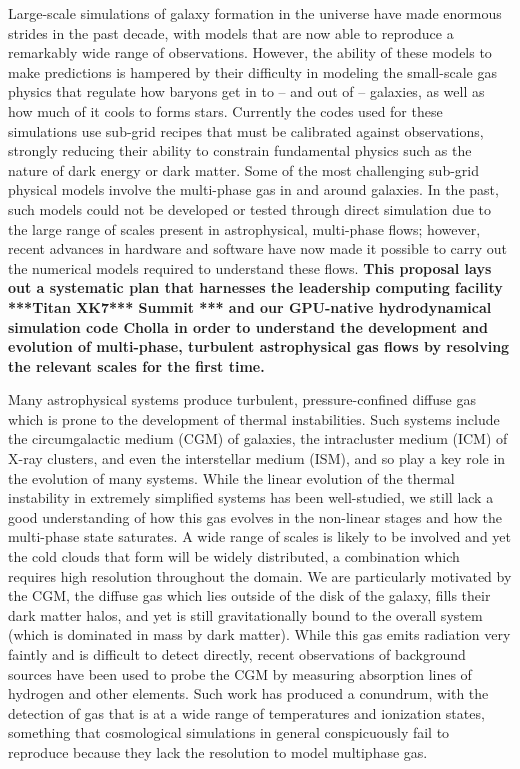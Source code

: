 \documentclass[11pt,letterpaper,english]{article}
\begin{document}
Large-scale simulations of galaxy formation in the universe have made enormous strides in the past decade, with models that are now able to reproduce a remarkably wide range of observations.  However, the ability of these models to make predictions is hampered by their difficulty in modeling the small-scale gas physics that regulate how baryons get in to -- and out of -- galaxies, as well as how much of it cools to forms stars.   Currently the codes used for these simulations use sub-grid recipes that must be calibrated against observations, strongly reducing their ability to constrain fundamental physics such as the nature of dark energy or dark matter.  Some of the most challenging sub-grid physical models involve the multi-phase gas in and around galaxies.   In the past, such models could not be developed or tested through direct simulation due to the large range of scales present in astrophysical, multi-phase flows; however, recent advances in hardware and software have now made it possible to carry out the numerical models required to understand these flows. {\bf This proposal lays out a systematic plan that harnesses the leadership computing facility ***Titan XK7*** Summit *** and our GPU-native hydrodynamical simulation code Cholla \cite{Cholla} in order to understand the development and evolution of multi-phase, turbulent astrophysical gas flows by resolving the relevant scales for the first time. }

Many astrophysical systems produce turbulent, pressure-confined diffuse gas which is prone to the development of thermal instabilities.  Such systems include the circumgalactic medium (CGM) of galaxies, the intracluster medium (ICM) of X-ray clusters, and even the interstellar medium (ISM), and so play a key role in the evolution of many systems.  While the linear evolution of the thermal instability in extremely simplified systems has been well-studied, we still lack a good understanding of how this gas evolves in the non-linear stages and how the multi-phase state saturates.  A wide range of scales is likely to be involved and yet the cold clouds that form will be widely distributed, a combination which requires high resolution throughout the domain.  We are particularly motivated by the CGM, the diffuse gas which lies outside of the disk of the galaxy, fills their dark matter halos, and yet is still gravitationally bound to the overall system (which is dominated in mass by dark matter).  While this gas emits radiation very faintly and is difficult to detect directly, recent observations of background sources have been used to probe the CGM by measuring absorption lines of hydrogen and other elements.  Such work has produced a conundrum, with the detection of gas that is at a wide range of temperatures and ionization states, something that cosmological simulations in general conspicuously fail to reproduce because they lack the resolution to model multiphase gas.
\end{document}
